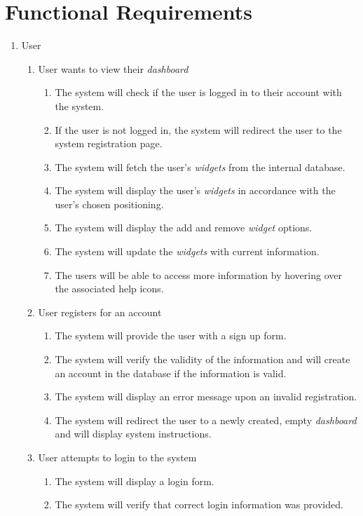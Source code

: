 \documentclass{article}
\begin{document}
	\section{Functional Requirements}
	\label{sec:functional_requirements}
	\begin{enumerate}[{VP}1]
		\item User
		\begin{enumerate}[{BE}1]
			\item User wants to view their \textit{dashboard}
			\begin{enumerate}
				\item The system will check if the user is logged in to their account with the system.
				\item If the user is not logged in, the system will redirect the user to the system registration page.
				\item The system will fetch the user's \textit{widgets} from the internal database.
				\item The system will display the user's  \textit{widgets} in accordance with the user's chosen positioning.
				\item The system will display the add and remove \textit{widget} options.
				\item The system will update the \textit{widgets} with current information.
				\item The users will be able to access more information by hovering over the associated help icons.
			\end{enumerate}
			\item User registers for an account
			\begin{enumerate}
				\item The system will provide the user with a sign up form.
				\item The system will verify the validity of the information and will create an account in the database if the information is valid.   
				\item The system will display an error message upon an invalid registration.
				\item The system will redirect the user to a newly created, empty \textit{dashboard} and will display system instructions.
			\end{enumerate}
			\item User attempts to login to the system
			\begin{enumerate}
				\item The system will display a login form.
				\item The system will verify that correct login information was provided.

\end{enumerate}
\end{enumerate}
\end{enumerate}
\end{document}

